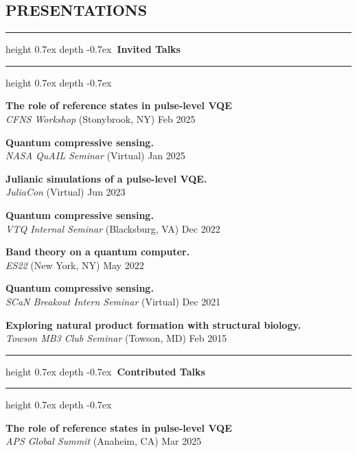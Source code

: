 \documentclass[marginmode, 10pt]{res} %
\def\Vhrulefill{\leavevmode\leaders\hrule height 0.7ex depth \dimexpr0.4pt-0.7ex\hfill\kern0pt}         %
\begin{document}
\begin{resume}

\pagebreak

\section{\small{PRESENTATIONS}}

\Vhrulefill \textbf{~Invited Talks~} \Vhrulefill

\textbf{The role of reference states in pulse-level VQE} \\
    \textit{CFNS Workshop} (Stonybrook, NY) \hfill Feb 2025

\textbf{Quantum compressive sensing.} \\
    \textit{NASA QuAIL Seminar} (Virtual) \hfill Jan 2025

\textbf{Julianic simulations of a pulse-level VQE.} \\
    \textit{JuliaCon} (Virtual) \hfill Jun 2023

\textbf{Quantum compressive sensing.} \\
    \textit{VTQ Internal Seminar} (Blacksburg, VA) \hfill Dec 2022

\textbf{Band theory on a quantum computer.} \\
    \textit{ES22} (New York, NY) \hfill May 2022

\textbf{Quantum compressive sensing.} \\
    \textit{SCaN Breakout Intern Seminar} (Virtual) \hfill Dec 2021

\textbf{Exploring natural product formation with structural biology.} \\
    \textit{Towson MB3 Club Seminar} (Towson, MD) \hfill Feb 2015



\Vhrulefill \textbf{~Contributed Talks~} \Vhrulefill

\textbf{The role of reference states in pulse-level VQE} \\
    \textit{APS Global Summit} (Anaheim, CA) \hfill Mar 2025


\end{resume}
\end{document}
